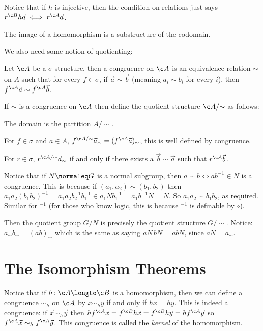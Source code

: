 \edefn

Notice that if $h$ is injective, then the condition on relations just says $r^{\c B}h\vec a\iff r^{\c A}\vec a$.

\blemm

    The image of a homomorphism is a substructure of the codomain.

\elemm

We also need some notion of quotienting:

\bdefn

    Let $\c A$ be a $\sigma$-structure, then a {\emphcolor congruence} on $\c A$ is an equivalence relation $\sim$ on $A$ such that for every $f\in\sigma$, if $\vec a\sim\vec b$ (meaning $a_i\sim b_i$
    for every $i$), then $f^{\c A}\vec a\sim f^{\c A}\vec b$.

    If $\sim$ is a congruence on $\c A$ then define the {\emphcolor quotient structure} $\c A/{\sim}$ as follows:
    \benum
        \item The domain is the partition $A/{\sim}$.
        \item For $f\in\sigma$ and $a\in A$, $f^{\c A/{\sim}}\vec a_\sim = (f^{\c A}\vec a)_\sim$, this is well defined by congruence.
        \item For $r\in\sigma$, $r^{\c A/{\sim}}\vec a_\sim$ if and only if there exists a $\vec b\sim\vec a$ such that $r^{\c A}\vec b$.
    \eenum

\edefn

Notice that if $N\normaleq G$ is a normal subgroup, then $a\sim b\iff ab^{-1}\in N$ is a congruence.
This is because if $(a_1,a_2)\sim(b_1,b_2)$ then $a_1a_2(b_1b_2)^{-1}=a_1a_2b_2^{-1}b_1^{-1}\in a_1Nb_1^{-1}=a_1b^{-1}N=N$.
So $a_1a_2\sim b_1b_2$, as required.
Similar for ${}^{-1}$ (for those who know logic, this is because ${}^{-1}$ is definable by $\circ$).

Then the quotient group $G/N$ is precisely the quotient structure $G/{\sim}$.
Notice: $a_\sim b_\sim = (ab)_\sim$ which is the same as saying $aN\,bN=abN$, since $aN=a_\sim$.

\section{The Isomorphism Theorems}

Notice that if $h\colon\c A\longto\c B$ is a homomorphism, then we can define a congruence $\sim_h$ on $\c A$ by $x\sim_hy$ if and only if $hx=hy$.
This is indeed a congruence: if $\vec x\sim_h\vec y$ then $hf^{\c A}\vec x=f^{\c B}h\vec x=f^{\c B}h\vec y=hf^{\c A}\vec y$ so $f^{\c A}\vec x\sim_hf^{\c A}\vec y$.
This congruence is called the {\it kernel} of the homomorphism.

